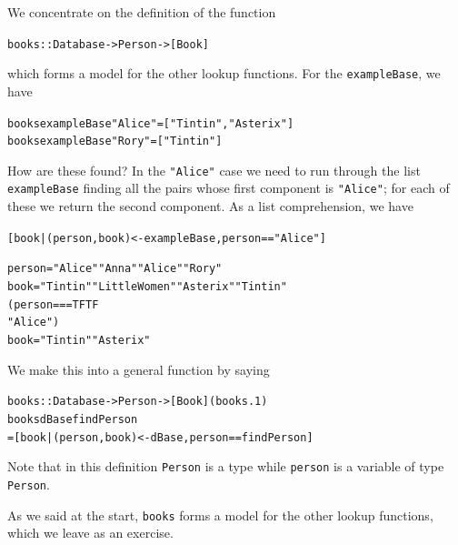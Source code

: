 We concentrate on the definition of the function 
\begin{alltt}
books :: Database -> Person -> [Book]
\end{alltt}
which forms a model for the other lookup functions. For the \texttt{exampleBase}, we have
\begin{alltt}
books exampleBase "Alice" = [ "Tintin" , "Asterix" ]
books exampleBase "Rory"  = [ "Tintin" ]
\end{alltt}
How are these found? In the \texttt{"Alice"} case we need to run through the 
list \texttt{exampleBase} finding all the pairs whose first component is
\texttt{"Alice"}; for each of these we return the second component. As a
list comprehension, we have
\begin{alltt}
[ book | (person,book) <- exampleBase , person=="Alice" ]

person       =   "Alice"    "Anna"           "Alice"     "Rory"
  book       =   "Tintin"   "Little Women"   "Asterix"   "Tintin"
(person==    =      T          F                T           F 
 "Alice")
  book       =   "Tintin"                    "Asterix"           
\end{alltt}
We make this into a general function by saying
\begin{alltt}
books       :: Database -> Person -> [Book]\hfill(books.1)
books dBase findPerson
  = [ book | (person,book) <- dBase , person==findPerson ]
\end{alltt}
Note that in this definition \texttt{Person} is a type while
\texttt{person} is a variable of type \texttt{Person}.

As we said at the start, \texttt{books} forms a model for the other lookup
functions, which we leave as an exercise. 

\begin{figure}[t]
\end{figure}

